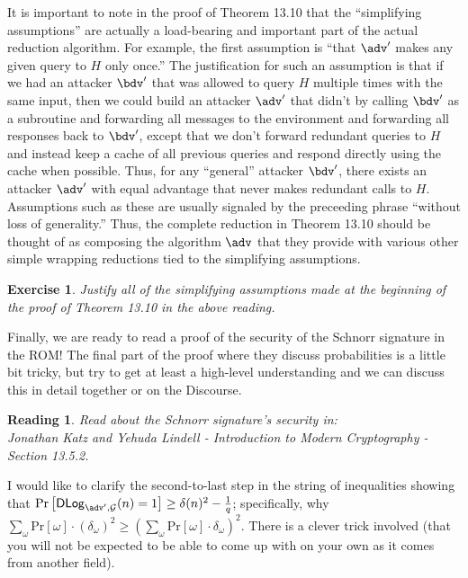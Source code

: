 \documentclass[12pt]{article}
\newcommand{\pr}[1]{\text{Pr}\left[#1\right]}
\newtheorem{exercise}{Exercise}
\newtheorem{reading}{Reading}
\theoremstyle{definition}
\theoremstyle{remark}
\theoremstyle{definition}
\begin{document}
It is important to note in the proof of Theorem 13.10 that the ``simplifying assumptions'' are actually a load-bearing and important part of the actual reduction algorithm. For example, the first assumption is ``that $\adv'$ makes any given query to $H$ only once.'' The justification for such an assumption is that if we had an attacker $\bdv'$ that was allowed to query $H$ multiple times with the same input, then we could build an attacker $\adv'$ that didn't by calling $\bdv'$ as a subroutine and forwarding all messages to the environment and forwarding all responses back to $\bdv'$, except that we don't forward redundant queries to $H$ and instead keep a cache of all previous queries and respond directly using the cache when possible. Thus, for any ``general'' attacker $\bdv'$, there exists an attacker $\adv'$ with equal advantage that never makes redundant calls to $H$. Assumptions such as these are usually signaled by the preceeding phrase ``without loss of generality.'' Thus, the complete reduction in Theorem 13.10 should be thought of as composing the algorithm $\adv$ that they provide with various other simple wrapping reductions tied to the simplifying assumptions.

\begin{exercise}
Justify all of the simplifying assumptions made at the beginning of the proof of Theorem 13.10 in the above reading.
\end{exercise}

Finally, we are ready to read a proof of the security of the Schnorr signature in the ROM! The final part of the proof where they discuss probabilities is a little bit tricky, but try to get at least a high-level understanding and we can discuss this in detail together or on the Discourse.

\begin{reading}
Read about the Schnorr signature's security in:\\
Jonathan Katz and Yehuda Lindell - Introduction to Modern Cryptography - Section 13.5.2.
\end{reading}

I would like to clarify the second-to-last step in the string of inequalities showing that $\pr{\mathsf{DLog}_{\adv', \mathcal{G}}(n) = 1} \geq \delta(n)^2 - \frac{1}{q}$; specifically, why $\sum_\omega \pr{\omega}\cdot (\delta_\omega)^2\geq \left(\sum_\omega \pr{\omega}\cdot \delta_\omega\right)^2.$ There is a clever trick involved (that you will not be expected to be able to come up with on your own as it comes from another field).
\end{document}
